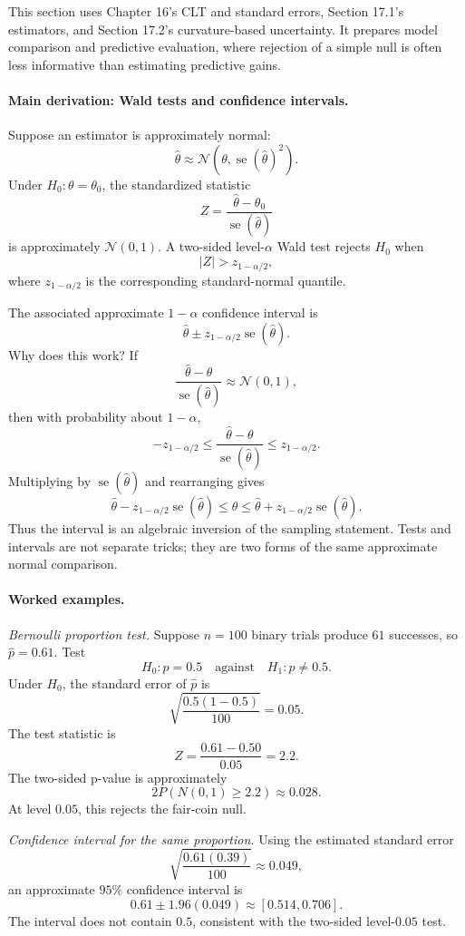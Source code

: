 This section uses Chapter 16's CLT and standard errors, Section 17.1's estimators, and Section 17.2's curvature-based uncertainty. It prepares model comparison and predictive evaluation, where rejection of a simple null is often less informative than estimating predictive gains.

\paragraph{Main derivation: Wald tests and confidence intervals.}
Suppose an estimator is approximately normal:
\[
\hat\theta\approx \mathcal N(\theta,\operatorname{se}(\hat\theta)^2).
\]
Under \(H_0:\theta=\theta_0\), the standardized statistic
\[
\boxed{
Z=\frac{\hat\theta-\theta_0}{\operatorname{se}(\hat\theta)}
}
\]
is approximately \(\mathcal N(0,1)\). A two-sided level-\(\alpha\) Wald test rejects \(H_0\) when
\[
|Z|>z_{1-\alpha/2},
\]
where \(z_{1-\alpha/2}\) is the corresponding standard-normal quantile.

The associated approximate \(1-\alpha\) confidence interval is
\[
\boxed{
\hat\theta\pm z_{1-\alpha/2}\operatorname{se}(\hat\theta).
}
\]
Why does this work? If
\[
\frac{\hat\theta-\theta}{\operatorname{se}(\hat\theta)}
\approx \mathcal N(0,1),
\]
then with probability about \(1-\alpha\),
\[
-z_{1-\alpha/2}
\leq
\frac{\hat\theta-\theta}{\operatorname{se}(\hat\theta)}
\leq
z_{1-\alpha/2}.
\]
Multiplying by \(\operatorname{se}(\hat\theta)\) and rearranging gives
\[
\hat\theta-z_{1-\alpha/2}\operatorname{se}(\hat\theta)
\leq
\theta
\leq
\hat\theta+z_{1-\alpha/2}\operatorname{se}(\hat\theta).
\]
Thus the interval is an algebraic inversion of the sampling statement. Tests and intervals are not separate tricks; they are two forms of the same approximate normal comparison.

\paragraph{Worked examples.}
\emph{Bernoulli proportion test.}
Suppose \(n=100\) binary trials produce \(61\) successes, so \(\hat p=0.61\). Test
\[
H_0:p=0.5
\quad\text{against}\quad
H_1:p\neq0.5.
\]
Under \(H_0\), the standard error of \(\hat p\) is
\[
\sqrt{\frac{0.5(1-0.5)}{100}}=0.05.
\]
The test statistic is
\[
Z=\frac{0.61-0.50}{0.05}=2.2.
\]
The two-sided p-value is approximately
\[
2P(N(0,1)\geq2.2)\approx0.028.
\]
At level \(0.05\), this rejects the fair-coin null.

\emph{Confidence interval for the same proportion.}
Using the estimated standard error
\[
\sqrt{\frac{0.61(0.39)}{100}}\approx0.049,
\]
an approximate \(95\%\) confidence interval is
\[
0.61\pm1.96(0.049)
\approx
[0.514,0.706].
\]
The interval does not contain \(0.5\), consistent with the two-sided level-\(0.05\) test.

